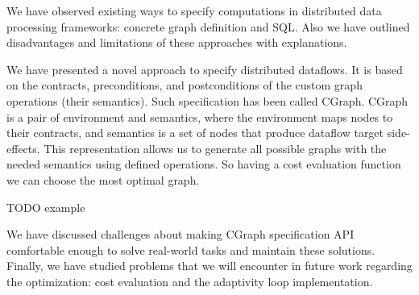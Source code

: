 We have observed existing ways to specify computations in distributed data processing frameworks: concrete graph definition and SQL.
Also we have outlined disadvantages and limitations of these approaches with explanations.

We have presented a novel approach to specify distributed dataflows.
It is based on the contracts, preconditions, and postconditions of the custom graph operations (their semantics).
Such specification has been called CGraph.
CGraph is a pair of environment and semantics, where the environment maps nodes to their contracts, and semantics is a set of nodes that produce dataflow target side-effects.
This representation allows us to generate all possible graphs with the needed semantics using defined operations.
So having a cost evaluation function we can choose the most optimal graph.

TODO example

We have discussed challenges about making CGraph specification API comfortable enough to solve real-world tasks and maintain these solutions.
Finally, we have studied problems that we will encounter in future work regarding the optimization: cost evaluation and the adaptivity loop implementation.
